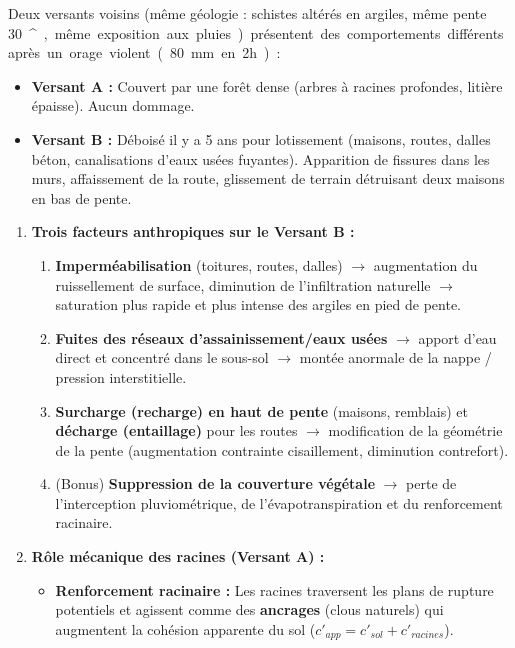 \documentclass[11pt]{article}
\providecommand{\degree}{^{\circ}}
\begin{document}
\begin{exercice}
Deux versants voisins (même géologie : schistes altérés en argiles, même pente \SI{30}{\degree}, même exposition aux pluies) présentent des comportements différents après un orage violent (\SI{80}{mm} en 2h) :
\begin{itemize}
\item \textbf{Versant A :} Couvert par une forêt dense (arbres à racines profondes, litière épaisse). Aucun dommage.
\item \textbf{Versant B :} Déboisé il y a 5 ans pour lotissement (maisons, routes, dalles béton, canalisations d'eaux usées fuyantes). Apparition de fissures dans les murs, affaissement de la route, glissement de terrain détruisant deux maisons en bas de pente.
\end{itemize}
\begin{enumerate}
\item \textbf{Trois facteurs anthropiques sur le Versant B :}
      \begin{enumerate}
      \item \textbf{Imperméabilisation} (toitures, routes, dalles) $\rightarrow$ augmentation du ruissellement de surface, diminution de l'infiltration naturelle $\rightarrow$ saturation plus rapide et plus intense des argiles en pied de pente.
      \item \textbf{Fuites des réseaux d'assainissement/eaux usées} $\rightarrow$ apport d'eau direct et concentré dans le sous-sol $\rightarrow$ montée anormale de la nappe / pression interstitielle.
      \item \textbf{Surcharge (recharge) en haut de pente} (maisons, remblais) et \textbf{décharge (entaillage)} pour les routes $\rightarrow$ modification de la géométrie de la pente (augmentation contrainte cisaillement, diminution contrefort).
      \item (Bonus) \textbf{Suppression de la couverture végétale} $\rightarrow$ perte de l'interception pluviométrique, de l'évapotranspiration et du renforcement racinaire.
      \end{enumerate}
\item \textbf{Rôle mécanique des racines (Versant A) :}
      \begin{itemize}
      \item \textbf{Renforcement racinaire :} Les racines traversent les plans de rupture potentiels et agissent comme des \textbf{ancrages} (clous naturels) qui augmentent la cohésion apparente du sol ($c'_{app} = c'_{sol} + c'_{racines}$).

\end{itemize}
\end{enumerate}
\end{exercice}
\end{document}
